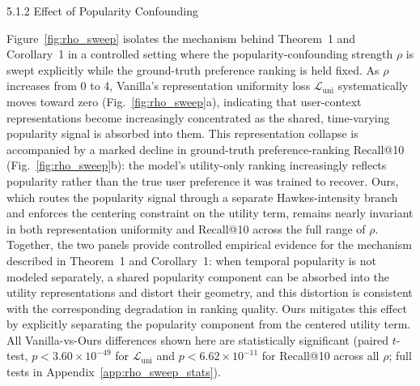 5.1.2 Effect of Popularity Confounding

Figure~\ref{fig:rho_sweep} isolates the mechanism behind Theorem~1 and Corollary~1 in a controlled setting where the popularity-confounding strength $\rho$ is swept explicitly while the ground-truth preference ranking is held fixed. As $\rho$ increases from 0 to 4, Vanilla's representation uniformity loss $\mathcal{L}_{\mathrm{uni}}$ systematically moves toward zero (Fig.~\ref{fig:rho_sweep}a), indicating that user-context representations become increasingly concentrated as the shared, time-varying popularity signal is absorbed into them. This representation collapse is accompanied by a marked decline in ground-truth preference-ranking Recall@10 (Fig.~\ref{fig:rho_sweep}b): the model's utility-only ranking increasingly reflects popularity rather than the true user preference it was trained to recover. Ours, which routes the popularity signal through a separate Hawkes-intensity branch and enforces the centering constraint on the utility term, remains nearly invariant in both representation uniformity and Recall@10 across the full range of $\rho$. Together, the two panels provide controlled empirical evidence for the mechanism described in Theorem~1 and Corollary~1: when temporal popularity is not modeled separately, a shared popularity component can be absorbed into the utility representations and distort their geometry, and this distortion is consistent with the corresponding degradation in ranking quality. Ours mitigates this effect by explicitly separating the popularity component from the centered utility term. All Vanilla-vs-Ours differences shown here are statistically significant (paired $t$-test, $p<3.60\times10^{-49}$ for $\mathcal{L}_{\mathrm{uni}}$ and $p<6.62\times10^{-11}$ for Recall@10 across all $\rho$; full tests in Appendix~\ref{app:rho_sweep_stats}).
